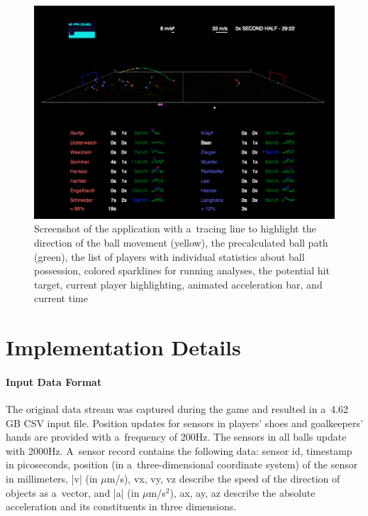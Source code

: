 \documentclass{sig-alternate}
\begin{document}
\begin{figure}[t!]
  \centering
  \includegraphics[width=\linewidth]{soccer.png}
  \caption{Screenshot of the application with a~tracing line to highlight the direction of the ball movement (yellow),
the precalculated ball path (green),  
the list of players with individual statistics about ball possession,
colored sparklines for running analyses, the potential hit target,
current player highlighting,
animated acceleration bar,
and current time}
  \label{fig:screenshot}
\end{figure}

\section{Implementation Details}
\label{sec:implementation-details}

\paragraph{Input Data Format}

The original data stream was captured during the game
and resulted in a~4.62 GB CSV input file.
Position updates for sensors in players' shoes
and goalkeepers' hands are provided with a~frequency of 200Hz.
The sensors in all balls update with 2000Hz.
A~sensor record contains the following data:
sensor id, timestamp in picoseconds, position
(in a~three-dimensional coordinate system) of the sensor
in millimeters, |v| (in $\mu$m/s), vx, vy, vz
describe the speed of the direction of objects as a~vector,
and |a| (in $\mu$m/s$^{2}$), ax, ay, az describe the absolute acceleration
and its constituents in three dimensions.
\end{document}
